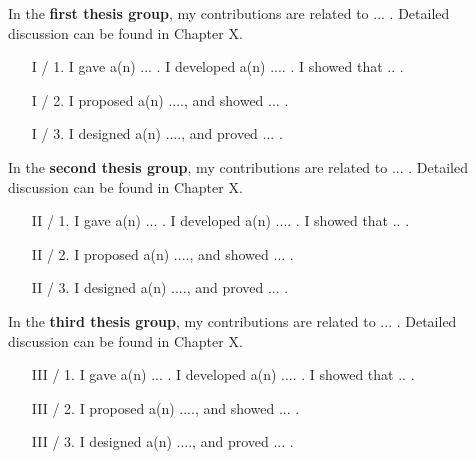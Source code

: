 \documentclass[12pt,a4paper]{extarticle}
\begin{document}
\vspace*{1em}

In the \textbf {first thesis group}, my contributions are related to ... . Detailed discussion can be found in Chapter X.
\vspace*{1em}
\begin{enumerate}[wide = 0pt, widest = {I/4.}, leftmargin =*]
    \item [I / 1.] I gave a(n) ... . I developed a(n) .... . 
    I showed that .. .
    
    \item [I / 2.] I proposed a(n) ...., and showed ... .
    
    \item [I / 3.] I designed a(n) ...., and proved ... .

\end{enumerate}

\vspace*{1em}
\noindent

In the \textbf {second thesis group}, my contributions are related to ... . Detailed discussion can be found in Chapter X.
\vspace*{1em}
\begin{enumerate}[wide = 0pt, widest = {II/5.}, leftmargin =*]
    \item [II / 1.] I gave a(n) ... . I developed a(n) .... . 
    I showed that .. .
    
    \item [II / 2.] I proposed a(n) ...., and showed ... .
    
    \item [II / 3.] I designed a(n) ...., and proved ... .
\end{enumerate}

\vspace*{1em}
\noindent

In the \textbf {third thesis group}, my contributions are related to ... . Detailed discussion can be found in Chapter X.

\begin{enumerate}[wide = 0pt, widest = {III/5.}, leftmargin =*]
    \item [III / 1.] I gave a(n) ... . I developed a(n) .... . 
    I showed that .. .
    
    \item [III / 2.] I proposed a(n) ...., and showed ... .
    
    \item [III / 3.] I designed a(n) ...., and proved ... .
\end{enumerate}
\end{document}

